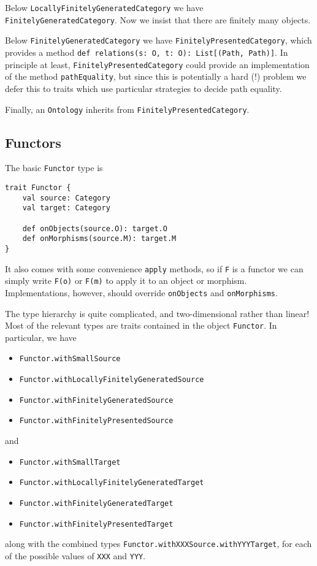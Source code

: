 \documentclass{amsart}
\newcommand{\type}[1]{{\tt #1}}
\newcommand{\code}[1]{{\tt #1}}
\begin{document}
Below \type{LocallyFinitelyGeneratedCategory} we have \type{FinitelyGeneratedCategory}. Now we insist that there are finitely many objects.

Below \type{FinitelyGeneratedCategory} we have \type{FinitelyPresentedCategory}, which provides a method \code{def relations(s: O, t: O): List[(Path, Path)]}. In principle at least, \type{FinitelyPresentedCategory} could provide an implementation of the method \code{pathEquality}, but since this is potentially a hard (!) problem we defer this to traits which use particular strategies to decide path equality.

Finally, an \type{Ontology} inherits from \type{FinitelyPresentedCategory}.

\subsection{Functors}
The basic \type{Functor} type is
\begin{verbatim}
trait Functor {
    val source: Category
    val target: Category
    
    def onObjects(source.O): target.O
    def onMorphisms(source.M): target.M
}
\end{verbatim}

It also comes with some convenience \code{apply} methods, so if \code{F} is a functor we can simply write \code{F(o)} or \code{F(m)} to apply it to an object or morphism. Implementations, however, should override \code{onObjects} and \code{onMorphisms}.

The type hierarchy is quite complicated, and two-dimensional rather than linear! Most of the relevant types are traits contained in the object \type{Functor}. In particular, we have
\begin{itemize}
\item \type{Functor.withSmallSource}
\item \type{Functor.withLocallyFinitelyGeneratedSource}
\item \type{Functor.withFinitelyGeneratedSource}
\item \type{Functor.withFinitelyPresentedSource}
\end{itemize}
and 
\begin{itemize}
\item \type{Functor.withSmallTarget}
\item \type{Functor.withLocallyFinitelyGeneratedTarget}
\item \type{Functor.withFinitelyGeneratedTarget}
\item \type{Functor.withFinitelyPresentedTarget}
\end{itemize}
along with the combined types \code{Functor.withXXXSource.withYYYTarget}, for each of the possible values of \code{XXX} and \code{YYY}.
\end{document}
